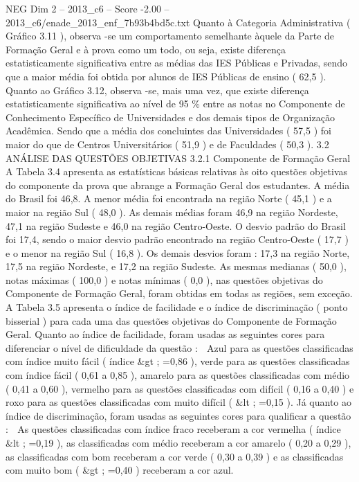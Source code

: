 \begin{textsample}{NEG Dim 2 – 2013\_c6 – Score -2.00 – 2013\_c6/enade\_2013\_enf\_7b93b4bd5c.txt}
Quanto à Categoria Administrativa ( Gráfico 3.11 ), observa -se um comportamento semelhante àquele da Parte de Formação Geral e à prova como um todo, ou seja, existe diferença estatisticamente significativa entre as médias das IES Públicas e Privadas, sendo que a maior média foi obtida por alunos de IES Públicas de ensino ( 62,5 ).
Quanto ao Gráfico 3.12, observa -se, mais uma vez, que existe diferença estatisticamente significativa ao nível de 95 \% entre as notas no Componente de Conhecimento Específico de Universidades e dos demais tipos de Organização Acadêmica.
Sendo que a média dos concluintes das Universidades ( 57,5 ) foi maior do que de Centros Universitários ( 51,9 ) e de Faculdades ( 50,3 ). 3.2 ANÁLISE DAS QUESTÕES OBJETIVAS 3.2.1 Componente de Formação Geral A Tabela 3.4 apresenta as estatísticas básicas relativas às oito questões objetivas do componente da prova que abrange a Formação Geral dos estudantes.
A média do Brasil foi 46,8.
A menor média foi encontrada na região Norte ( 45,1 ) e a maior na região Sul ( 48,0 ).
As demais médias foram 46,9 na região Nordeste, 47,1 na região Sudeste e 46,0 na região Centro-Oeste.
O desvio padrão do Brasil foi 17,4, sendo o maior desvio padrão encontrado na região Centro-Oeste ( 17,7 ) e o menor na região Sul ( 16,8 ).
Os demais desvios foram : 17,3 na região Norte, 17,5 na região Nordeste, e 17,2 na região Sudeste.
As mesmas medianas ( 50,0 ), notas máximas ( 100,0 ) e notas mínimas ( 0,0 ), nas questões objetivas do Componente de Formação Geral, foram obtidas em todas as regiões, sem exceção.
A Tabela 3.5 apresenta o índice de facilidade e o índice de discriminação ( ponto bisserial ) para cada uma das questões objetivas do Componente de Formação Geral.
Quanto ao índice de facilidade, foram usadas as seguintes cores para diferenciar o nível de dificuldade da questão :  Azul para as questões classificadas com índice muito fácil ( índice \&gt ; =0,86 ), verde para as questões classificadas com índice fácil ( 0,61 a 0,85 ), amarelo para as questões classificadas com médio ( 0,41 a 0,60 ), vermelho para as questões classificadas com difícil ( 0,16 a 0,40 ) e roxo para as questões classificadas com muito difícil ( \&lt ; =0,15 ).
Já quanto ao índice de discriminação, foram usadas as seguintes cores para qualificar a questão :  As questões classificadas com índice fraco receberam a cor vermelha ( índice \&lt ; =0,19 ), as classificadas com médio receberam a cor amarelo ( 0,20 a 0,29 ), as classificadas com bom receberam a cor verde ( 0,30 a 0,39 ) e as classificadas com muito bom ( \&gt ; =0,40 ) receberam a cor azul.

\end{textsample}
